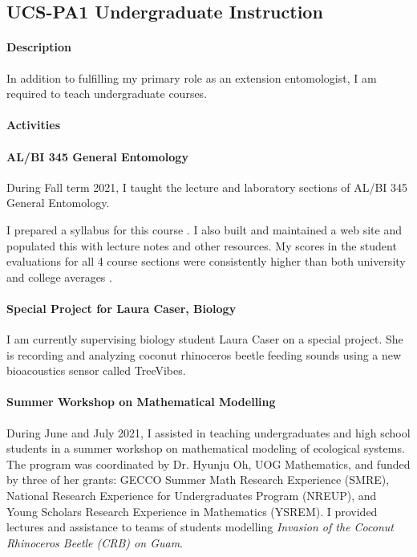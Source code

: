 \subsection{UCS-PA1 Undergraduate Instruction}
\begin{refsection}
	
\paragraph{Description}

In addition to fulfilling my primary role as an extension entomologist, I am required to teach undergraduate courses.

\paragraph{Activities}


\paragraph{AL/BI 345 General Entomology}
During Fall term 2021, I taught the lecture and laboratory sections of AL/BI 345 General Entomology.

I prepared a syllabus for this course \cite{moore_syllabus_2021}. I also built and maintained a web site \cite{moore_web_2021} and populated this with lecture notes and other resources.  My scores in the student evaluations for all 4 course sections were consistently higher than both university and college averages \cite{moore_instructor_2021}.

\paragraph{Special Project for Laura Caser, Biology}
I am currently supervising biology student Laura Caser on a special project. She is recording and analyzing coconut rhinoceros beetle feeding sounds using a new bioacoustics sensor called TreeVibes.

\paragraph{Summer Workshop on Mathematical Modelling}

During June and July 2021, I assisted in teaching undergraduates and high school students in a summer workshop on mathematical modeling of ecological systems. The program was coordinated by Dr. Hyunju Oh, UOG Mathematics, and funded by three of her grants: GECCO Summer Math Research Experience (SMRE), National Research Experience for Undergraduates Program (NREUP), and Young Scholars Research Experience in Mathematics (YSREM). I provided lectures and assistance to teams of students modelling \textit{Invasion of the Coconut Rhinoceros Beetle (CRB) on Guam}.


\end{refsection}
